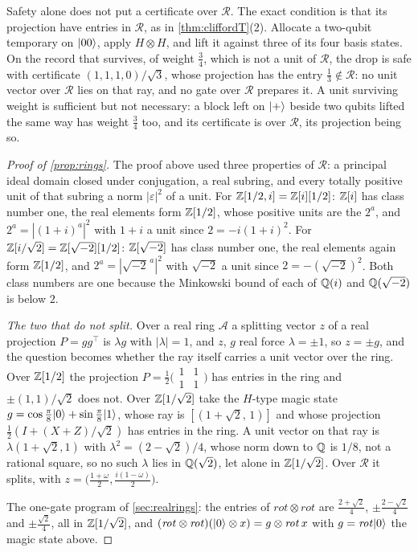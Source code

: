 \documentclass[acmsmall,screen,review,anonymous,nonacm]{acmart}
\begin{document}
Safety alone does not put a certificate over $\mathcal R$. The exact
condition is that its projection have entries in $\mathcal R$, as in
\cref{thm:cliffordT}(2). Allocate a two-qubit
temporary on $\lvert 00 \rangle$, apply $H \otimes H$, and lift it against three of
its four basis states. On the record that survives, of weight $\tfrac34$,
which is not a unit of $\mathcal R$, the drop is safe with certificate
$(1,1,1,0)/\sqrt3$, whose projection has the entry $\tfrac13 \notin
\mathcal R$: no unit vector over $\mathcal R$ lies on that ray, and no gate
over $\mathcal R$ prepares it. A unit surviving weight is sufficient but not
necessary: a block left
on $\lvert + \rangle$ beside two qubits lifted the same way has weight $\tfrac34$ too,
and its certificate is over $\mathcal R$, its projection being so.

\begin{proof}[Proof of \cref{prop:rings}]
The proof above used three properties of $\mathcal R$: a principal ideal
domain closed under conjugation, a real subring, and every totally positive
unit of that subring a norm $|\varepsilon|^{2}$ of a unit. For
$\mathbb{Z}[1/2, i] = \mathbb{Z}[i][1/2]$: $\mathbb{Z}[i]$ has class number one, the real elements
form $\mathbb{Z}[1/2]$, whose positive units are the $2^{a}$, and
$2^{a} = |(1+i)^{a}|^{2}$ with $1+i$ a unit since $2 = -i(1+i)^{2}$. For
$\mathbb{Z}[i/\sqrt2] = \mathbb{Z}[\sqrt{-2}][1/2]$: $\mathbb{Z}[\sqrt{-2}]$ has class number one,
the real elements again form $\mathbb{Z}[1/2]$, and $2^{a} = |\sqrt{-2}^{\,a}|^{2}$
with $\sqrt{-2}$ a unit since $2 = -(\sqrt{-2})^{2}$. Both class numbers are
one because the Minkowski bound of each of $\mathbb{Q}(i)$ and $\mathbb{Q}(\sqrt{-2})$ is
below $2$.

\emph{The two that do not split.} Over a real ring $\mathcal A$ a splitting
vector $z$ of a real projection $P = gg^{\top}$ is $\lambda g$ with
$|\lambda| = 1$, and $z$, $g$ real force $\lambda = \pm1$, so $z = \pm g$, and the question becomes
whether the ray itself carries a unit vector over the ring. Over $\mathbb{Z}[1/2]$ the
projection $P = \tfrac12\bigl(\begin{smallmatrix}1 & 1\\ 1 &
1\end{smallmatrix}\bigr)$ has entries in the ring and $\pm(1,1)/\sqrt2$ does
not. Over $\mathbb{Z}[1/\sqrt2]$ take the $H$-type magic state $g = \cos\tfrac\pi8
\lvert 0 \rangle + \sin\tfrac\pi8\lvert 1 \rangle$, whose ray is $[(1+\sqrt2,\,1)]$ and whose
projection $\tfrac12(I + (X+Z)/\sqrt2)$ has entries in the ring. A unit
vector on that ray is $\lambda(1+\sqrt2, 1)$ with
$\lambda^{2} = (2-\sqrt2)/4$, whose norm down to $\mathbb{Q}$ is $1/8$, not a
rational square, so no such $\lambda$ lies in $\mathbb{Q}(\sqrt2)$, let alone in
$\mathbb{Z}[1/\sqrt2]$. Over $\mathcal R$ it splits, with
$z = \bigl(\tfrac{1+\omega}{2}, \tfrac{i(1-\omega)}{2}\bigr)$.

The one-gate program of \cref{sec:realrings}: the entries of
$\mathit{rot} \otimes \mathit{rot}$ are $\tfrac{2 + \sqrt2}{4}$, $\pm\tfrac{2 - \sqrt2}{4}$ and
$\pm\tfrac{\sqrt2}{4}$, all in $\mathbb{Z}[1/\sqrt2]$, and
$(\mathit{rot} \otimes \mathit{rot})(\lvert 0 \rangle \otimes x) = g \otimes
\mathit{rot}\,x$ with $g = \mathit{rot}\lvert 0 \rangle$ the magic state above.
\end{proof}
\end{document}
